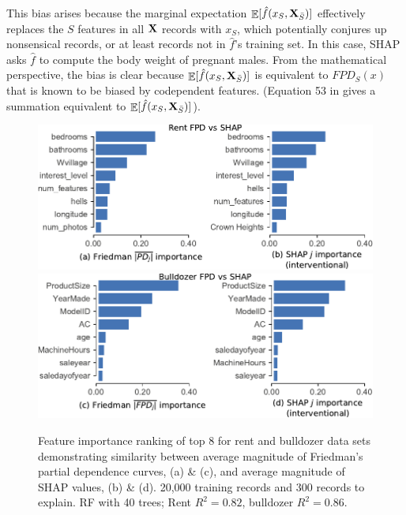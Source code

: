 \documentclass[11pt]{article}
\DeclareMathOperator{\Ex}{\mathbb{E}}
\begin{document}
This bias arises because the marginal expectation $\Ex[\hat{f}(x_{S},{\bf X}_{\bar{S}})]$ effectively replaces the $S$ features in all $\bf X$ records with $x_S$, which potentially conjures up nonsensical records, or at least records not in $\hat{f}$'s training set.  In this case, SHAP asks $\hat{f}$ to compute the body weight of pregnant males. From the mathematical perspective, the bias is clear because $\Ex[\hat{f}(x_{S},{\bf X}_{\bar{S}})]$ is equivalent to $FPD_S(x)$ that is known to be biased by codependent features. (Equation 53 in \citealt{PDP} gives a summation equivalent to $\Ex[\hat{f}(x_{S},{\bf X}_{\bar{S}})]$).  

\begin{figure}[htbp]
\begin{center}
\includegraphics[scale=0.53]{images/rent-pdp-vs-shap.pdf}\includegraphics[scale=0.53]{images/bulldozer-pdp-vs-shap.pdf}
\caption[short]{\small  Feature importance ranking of top 8 for rent and bulldozer data sets demonstrating similarity between average magnitude of Friedman's partial dependence curves, (a) \& (c), and average magnitude of SHAP values, (b) \& (d). 20,000 training records and 300 records to explain. RF with 40 trees; Rent $R^2 = 0.82$, bulldozer $R^2 = 0.86$.}
\label{fig:FPD_vs_SHAP}
\end{center}
\end{figure}
\end{document}
